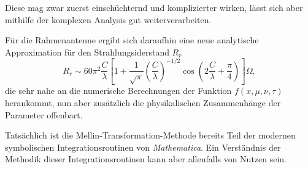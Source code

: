 Diese mag zwar zuerst einschüchternd und komplizierter wirken, lässt 
sich aber mithilfe der komplexen Analysis gut weiterverarbeiten.

Für die Rahmenantenne ergibt sich daraufhin eine neue analytische 
Approximation für den Strahlungsiderstand $R_r$
\[
    R_r \sim 60\pi^2 \frac{C}{\lambda}
    \left[1+\frac{1}{\sqrt{\pi}}\left(\frac{C}{\lambda}\right)^{-1/2} \cos\left(2\frac{C}{\lambda}+\frac{\pi}{4}\right)\right] \Omega
    ,
\]
die sehr nahe an die numerische Berechnungen der Funktion $f(x, \mu, \nu, \tau)$ 
herankommt, nun aber zusätzlich die physikalischen Zusammenhänge der 
Parameter offenbart.
\medskip

Tatsächlich ist die Mellin-Transformation-Methode bereits Teil der  
modernen symbolischen Integrationsroutinen von {\em Mathematica}.
Ein Verständnis der Methodik dieser Integrationsroutinen kann aber
allenfalls von Nutzen sein.


